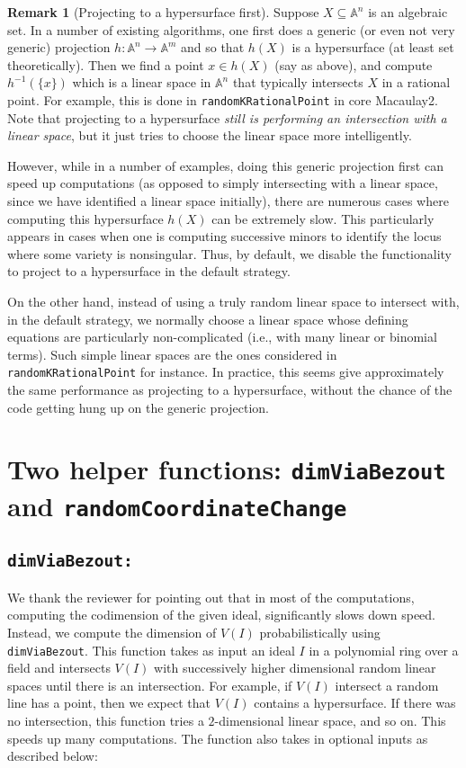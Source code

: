 \documentclass[11pt]{amsart}
\theoremstyle{definition}
\newtheorem{remark}{Remark}[subsection]
\newcommand{\bA}{\mathbb{A}}
\begin{document}
\begin{remark}[Projecting to a hypersurface first]
    \label{rem.ProjectingToAHypersurfaceFirst}
    Suppose $X \subseteq \bA^n$ is an algebraic set.  In a number of existing algorithms, one first does a generic (or even not very generic) projection $h : \bA^n \to \bA^m$ and so that $h(X)$ is a hypersurface (at least set theoretically).  Then we find a point $x \in h(X)$ (say as above), and compute $h^{-1}(\{ x \})$ which is a linear space in $\bA^n$ that typically intersects $X$ in a rational point.   For example, this is done in {\tt randomKRationalPoint} in core Macaulay2.  Note that projecting to a hypersurface \emph{still is performing an intersection with a linear space}, but it just tries to choose the linear space more intelligently.

    However, while in a number of examples, doing this generic projection first can speed up computations (as opposed to simply intersecting with a linear space, since we have identified a linear space initially), there are numerous cases where computing this hypersurface $h(X)$ can be extremely slow.  This particularly appears in cases when one is computing successive minors to identify the locus where some variety is nonsingular.  Thus, by default, we disable the functionality to project to a hypersurface in the default strategy.

    On the other hand, instead of using a truly random linear space to intersect with, in the default strategy, we normally choose a linear space whose defining equations are particularly non-complicated (i.e., with many linear or binomial terms).  Such simple linear spaces are the ones considered in {\tt randomKRationalPoint} for instance.  In practice, this seems give approximately the same performance as projecting to a hypersurface, without the chance of the code getting hung up on the generic projection.
\end{remark}


\section{Two helper functions: {\tt dimViaBezout} and {\tt randomCoordinateChange}}{\label{helper}}

\subsection*{\tt dimViaBezout:} We thank the reviewer for pointing out that in most of the computations, computing the codimension of the given ideal, significantly slows down speed. Instead, we compute the dimension of $V(I)$ probabilistically using {\tt dimViaBezout}. This function takes as input an ideal $I$ in a polynomial ring over a field and intersects $V(I)$ with successively higher dimensional random linear spaces until there is an intersection.  For example, if $V(I)$ intersect a random line has a point, then we expect that $V(I)$ contains a hypersurface.  If there was no intersection, this function tries a $2$-dimensional linear space, and so on.  This speeds up many computations. The function also takes in optional inputs as described below:
\end{document}
